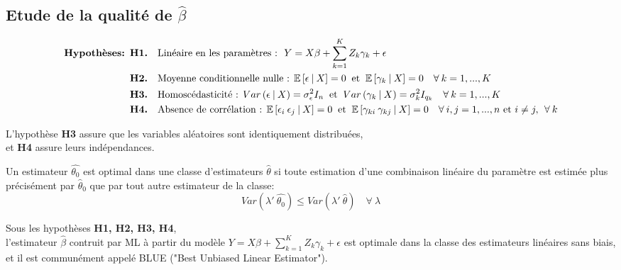 \documentclass[11pt,fleqn]{book} %
\begin{document}
	\vspace{1em}
	
	\subsection{Etude de la qualité de $\hat{\beta}$}
	
	\begin{align*}
		\textbf{Hypothèses: } &\textbf{H1.} \quad \textnormal{Linéaire en les paramètres : }\: Y=X\beta+\sum_{k=1}^{K} Z_k \gamma_k+\epsilon \\
		&\textbf{H2.} \quad \textnormal{Moyenne conditionnelle nulle : } \mathbb{E}\left[\epsilon\:|\:X\right]=0\:\textnormal{ et }\: \mathbb{E}\left[\gamma_{k}\:|\:X\right]=0  \quad \forall\: k=1,...,K\\ 
		&\textbf{H3.} \quad \textnormal{Homoscédasticité : }  Var\left(\epsilon\:|\:X\right)=\sigma_{\epsilon}^2 I_n  \:\textnormal{ et }\: Var\left(\gamma_{k}\:|\:X\right)=\sigma_k^2 I_{q_k}  \quad \forall\: k=1,...,K\\ 
		&\textbf{H4.} \quad \textnormal{Absence de corrélation : }   \mathbb{E}\left[\epsilon_{i}\:\epsilon_{j}\:|\:X\right]=0 \:\textnormal{ et }\: \mathbb{E}\left[\gamma_{ki}\:\gamma_{kj}\:|\:X\right]=0  \quad \forall\: i,j=1,...,n \textnormal{ et } i\neq j,\:\: \forall\: k 
	\end{align*}
	
	\begin{remark}
		L'hypothèse \textbf{H3} assure que les variables aléatoires sont identiquement distribuées,\\ et \textbf{H4} assure leurs indépendances.
	\end{remark}
	
	\vspace{1em}
	
	\begin{definition}
		Un estimateur $\hat{\theta_0}$ est optimal dans une classe d'estimateurs $\hat{\theta}$ si toute estimation d'une combinaison linéaire du paramètre est estimée plus précisément par $\hat{\theta}_0$ que par tout autre estimateur de la classe:
		\[
		Var(\lambda'\:\hat{\theta_0})\leq Var(\lambda'\:\hat{\theta}) \quad \forall\:\lambda
		\]
	\end{definition}
	
	\vspace{2em}
	
	\begin{theorem}
		Sous les hypothèses \textbf{H1, H2, H3, H4},\\ 
		l'estimateur $\hat{\beta}$ contruit par ML à partir du modèle $Y=X\beta+\sum_{k=1}^{K} Z_k \gamma_k +\epsilon$ est optimale dans la classe des estimateurs linéaires sans biais, et il est communément appelé BLUE ("Best Unbiased Linear Estimator").
	\end{theorem}
	
\end{document}
